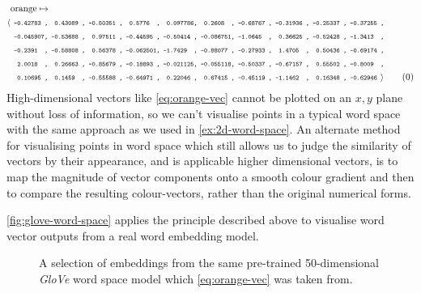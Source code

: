 \documentclass{ucetd}
\begin{document}
\begin{align*}
  &\text{orange}\mapsto\\
  \text{\small{$\langle$}}
  &\texttt{\scriptsize ~-0.42783~,~~0.43089~,~-0.50351~,~~0.5776~~,~~0.097786,~~0.2608~~,~-0.68767~,~-0.31936~,~-0.25337~,~-0.37255~,}\\
  &\texttt{\scriptsize ~-0.045907,~-0.53688~,~~0.97511~,~-0.44595~,~-0.50414~,~-0.086751,~-1.0645~~,~~0.36625~,~-0.52428~,~-1.3413~~,}\\
  &\texttt{\scriptsize ~-0.2391~~,~-0.58808~,~~0.56378~,~-0.062501,~-1.7429~~,~-0.88077~,~-0.27933~,~~1.4705~~,~~0.50436~,~-0.69174~,}\\
  &\texttt{\scriptsize ~~2.0018~~,~~0.26663~,~-0.85679~,~-0.18893~,~-0.021125,~-0.055118,~-0.50337~,~-0.67157~,~~0.55502~,~-0.8009~~,}\\
  &\texttt{\scriptsize ~~0.10695~,~~0.1459~~,~-0.55588~,~-0.64971~,~~0.22046~,~~0.67415~,~-0.45119~,~-1.1462~~,~~0.16348~,~-0.62946~}
  \text{\small{$\rangle$}}\tag{\theequation}\label{eq:orange-vec}\vspace{-1.0em}
\end{align*}
High-dimensional vectors like \eqref{eq:orange-vec} cannot be plotted on an $x,y$ plane without loss of information, so we can't visualise points in a typical word space with the same approach as we used in \autoref{ex:2d-word-space}. An alternate method for visualising points in word space which still allows us to judge the similarity of vectors by their appearance, and is applicable higher dimensional vectors, is to map the magnitude of vector components onto a smooth colour gradient and then to compare the resulting colour-vectors, rather than the original numerical forms.
\begin{example}\label{ex:glove-word-space}
\autoref{fig:glove-word-space} applies the principle described above to visualise word vector outputs from a real word embedding model.
\begin{figure}[H]
  \captionsetup{width=.91\linewidth}
 \centering
 
 \caption{A selection of embeddings from the same pre-trained 50-dimensional \emph{GloVe} word space model which \eqref{eq:orange-vec} was taken from.}\label{fig:glove-word-space}
 \centering
\end{figure}
\end{example}
\end{document}

